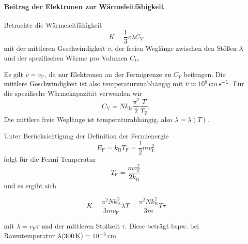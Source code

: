 \paragraph{Beitrag der Elektronen zur Wärmeleitfähigkeit}
	Betrachte die Wärmeleitfähigkeit
	\begin{equation}
		\label{eq:II.7.21}
		K = \frac{1}{3} \overline{v} \lambda C_{V}
	\end{equation}
	mit der mittleren Geschwindigkeit $\overline{v}$, der freien Weglänge zwischen den Stößen $\lambda$ und der spezifischen Wärme pro Volumen $C_{V}$. 
	
	Es gilt $\overline{v} = v_{\mathrm{F}}$, da nur Elektronen an der Fermigrenze zu $C_{V}$ beitragen. 
	Die mittlere Geschwindigkeit ist also temperaturunabhängig mit $\overline{v}\simeq\SI{e 8}{ \centi \meter \per \second}$.
	Für die spezifische Wärmekapazität verwenden wir
	$$
		C_\mathrm{V} = Nk_\mathrm{B}\frac{\pi^2}{2}\frac{T}{T_\mathrm{F}}.
	$$
	Die mittlere freie Weglänge ist temperaturabhängig, also $\lambda=\lambda(T)$.

	Unter Berücksichtigung der Definition der Fermienergie
	$$
	E_{\mathrm{F}} = k_{\mathrm{B}}T_{\mathrm{F}} = \frac{1}{2} m v_{\mathrm{F}}^2
	$$ 
	folgt für die Fermi-Temperatur
	\begin{equation}
		\label{eq:II.7.22}
		T_{\mathrm{F}} = \frac{m v_{\mathrm{F}}^2}{2k_{\mathrm{B}}}
	\end{equation}
	und es ergibt sich
	\begin{important}
		\begin{equation}
			\label{eq:II.7.23}
			K = \frac{\pi^2 N k_{\mathrm{B}}^2}{3mv_{\mathrm{F}}}\lambda T = \frac{\pi^2 N k_{\mathrm{B}}^2}{3m}T \tau 
		\end{equation}
	\end{important}
	
	mit $\lambda = v_{\mathrm{F}}\tau $ und der mittleren Stoßzeit $\tau $. Diese beträgt bspw. bei Raumtemperatur $\lambda(\SI{300}{\kelvin}) = \SI{e -5}{ \centi \meter}$

